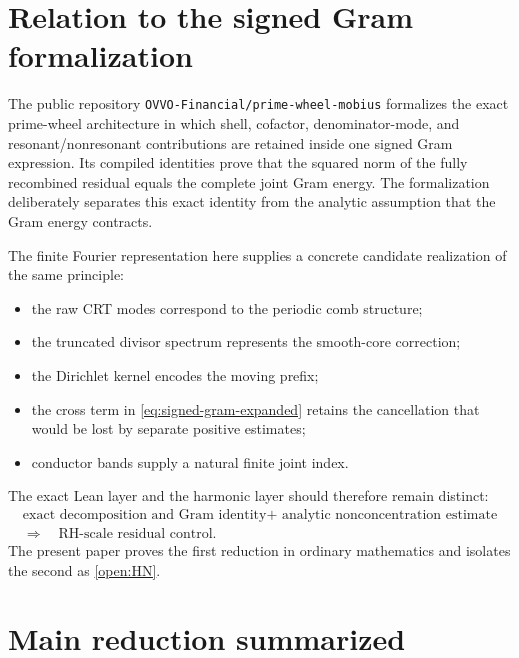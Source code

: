 \documentclass[11pt]{article}
\theoremstyle{definition}
\begin{document}
\section{Relation to the signed Gram formalization}

The public repository \texttt{OVVO-Financial/prime-wheel-mobius} formalizes the exact prime-wheel architecture in which shell, cofactor, denominator-mode, and resonant/nonresonant contributions are retained inside one signed Gram expression.  Its compiled identities prove that the squared norm of the fully recombined residual equals the complete joint Gram energy.  The formalization deliberately separates this exact identity from the analytic assumption that the Gram energy contracts.

The finite Fourier representation here supplies a concrete candidate realization of the same principle:
\begin{itemize}
\item the raw CRT modes correspond to the periodic comb structure;
\item the truncated divisor spectrum represents the smooth-core correction;
\item the Dirichlet kernel encodes the moving prefix;
\item the cross term in \eqref{eq:signed-gram-expanded} retains the cancellation that would be lost by separate positive estimates;
\item conductor bands supply a natural finite joint index.
\end{itemize}

The exact Lean layer and the harmonic layer should therefore remain distinct:
\[
\begin{gathered}
\text{exact decomposition and Gram identity}
+\text{ analytic nonconcentration estimate}\\
\Longrightarrow\quad \text{RH-scale residual control}.
\end{gathered}
\]
The present paper proves the first reduction in ordinary mathematics and isolates the second as \cref{open:HN}.


\section{Main reduction summarized}
\end{document}
